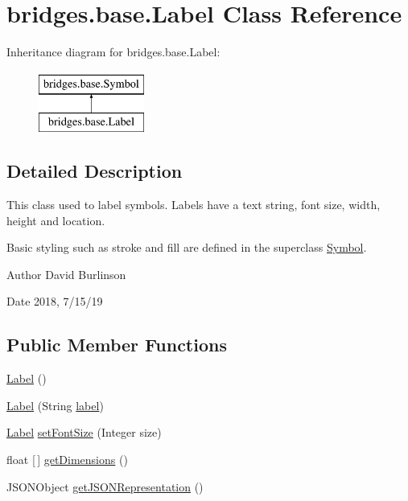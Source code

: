 \hypertarget{classbridges_1_1base_1_1_label}{}\section{bridges.\+base.\+Label Class Reference}
\label{classbridges_1_1base_1_1_label}
Inheritance diagram for bridges.\+base.\+Label\+:\begin{figure}[H]
\begin{center}
\leavevmode
\includegraphics[height=2.000000cm]{classbridges_1_1base_1_1_label}
\end{center}
\end{figure}


\subsection{Detailed Description}
This class used to label symbols. Labels have a text string, font size, width, height and location. 

Basic styling such as stroke and fill are defined in the superclass \hyperlink{classbridges_1_1base_1_1_symbol}{Symbol}.

\begin{DoxyAuthor}{Author}
David Burlinson 
\end{DoxyAuthor}
\begin{DoxyDate}{Date}
2018, 7/15/19 
\end{DoxyDate}
\subsection*{Public Member Functions}
\begin{DoxyCompactItemize}
\item 
\hyperlink{classbridges_1_1base_1_1_label_adaed1c29dc02eb0f77d772b256b9eae4}{Label} ()
\item 
\hyperlink{classbridges_1_1base_1_1_label_a0ffb2cdafae3f2c21e0925f2fe23df87}{Label} (String \hyperlink{classbridges_1_1base_1_1_symbol_ad2adcc82e6a96c2f3c465702502655e9}{label})
\item 
\hyperlink{classbridges_1_1base_1_1_label}{Label} \hyperlink{classbridges_1_1base_1_1_label_ab5f2d60e519db2499f326c4ccb967b25}{set\+Font\+Size} (Integer size)
\item 
float \mbox{[}$\,$\mbox{]} \hyperlink{classbridges_1_1base_1_1_label_a476a68af051d561b805babc1d397b031}{get\+Dimensions} ()
\item 
J\+S\+O\+N\+Object \hyperlink{classbridges_1_1base_1_1_label_a6befc6655ce36868213be289571c6315}{get\+J\+S\+O\+N\+Representation} ()
\end{DoxyCompactItemize}
